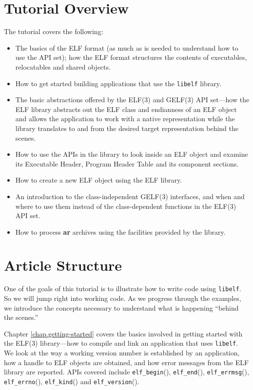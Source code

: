\documentclass[a4paper]{book}
\newcommand{\function}[1]{\texttt{#1}()}
\newcommand{\library}[1]{\texttt{#1}}
\newcommand{\tool}[1]{\textbf{#1}}
\begin{document}
\section{Tutorial Overview}
The tutorial covers the following:

\begin{itemize}
\item The basics of the ELF format (as much as is needed to understand
  how to use the API set); how the ELF format structures the contents
  of executables, relocatables and shared objects.
\item How to get started building applications that use the
  \library{libelf} library.
\item The basic abstractions offered by the ELF(3) and GELF(3) API
  set---how the ELF library abstracts out the ELF class and endianness
  of an ELF object and allows the application to work with a native
  representation while the library translates to and from the desired
  target representation behind the scenes.
\item How to use the APIs in the library to look inside an ELF object and examine its Executable Header, Program
  Header Table and its component sections.
\item How to create a new ELF object using the ELF library.
\item An introduction to the class-independent GELF(3) interfaces, and when and where to use them
 instead of the class-dependent functions in the ELF(3) API set.
\item How to process \tool{ar} archives using the facilities provided by the library.
\end{itemize}

\section{Article Structure}
One of the goals of this tutorial is to illustrate how to write code
using \library{libelf}.  So we will jump right into working code.  As
we progress through the examples, we introduce the concepts necessary
to understand what is happening ``behind the scenes.''

Chapter \vref{chap.getting-started} covers the basics involved in
getting started with the ELF(3) library---how to compile and link an
application that uses \library{libelf}.  We look at the way a working
version number is established by an application, how a handle to ELF
objects are obtained, and how error messages from the ELF library are
reported.  APIs covered include \function{elf\_begin},
\function{elf\_end}, \function{elf\_errmsg}, \function{elf\_errno},
\function{elf\_kind} and \function{elf\_version}.
\end{document}
